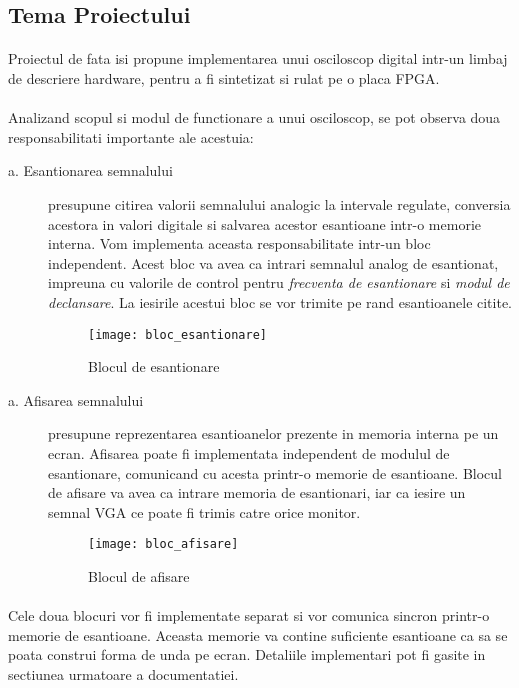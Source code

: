 \subsection{Tema Proiectului}
\paragraph{}
Proiectul de fata isi propune implementarea unui osciloscop digital intr-un limbaj de descriere hardware, pentru a fi sintetizat si rulat pe o placa FPGA.

\paragraph{}
Analizand scopul si modul de functionare a unui osciloscop, se pot observa doua responsabilitati importante ale acestuia:

\begin{description}
	\item[a. Esantionarea semnalului]
		presupune citirea valorii semnalului analogic la intervale regulate, conversia acestora in valori digitale si salvarea acestor esantioane intr-o memorie interna. Vom implementa aceasta responsabilitate intr-un bloc independent. Acest bloc va avea ca intrari semnalul analog de esantionat, impreuna cu valorile de control pentru \emph{frecventa de esantionare} si \emph{modul de declansare}. La iesirile acestui bloc se vor trimite pe rand esantioanele citite.
		
\begin{figure}[h]
	\centering
	\texttt{[image: bloc\_esantionare]}
	\caption{Blocul de esantionare}
	\label{fig:bloc_esantionare}
\end{figure}		
		
	\item[a. Afisarea semnalului]		
		presupune reprezentarea esantioanelor prezente in memoria interna pe un ecran. Afisarea poate fi implementata independent de modulul de esantionare, comunicand cu acesta printr-o memorie de esantioane. Blocul de afisare va avea ca intrare memoria de esantionari, iar ca iesire un semnal VGA ce poate fi trimis catre orice monitor.
		
\begin{figure}[h]
	\centering
	\texttt{[image: bloc\_afisare]}
	\caption{Blocul de afisare}
	\label{fig:bloc_afisare}
\end{figure}		
\end{description}

\paragraph{}
Cele doua blocuri vor fi implementate separat si vor comunica sincron printr-o memorie de esantioane. Aceasta memorie va contine suficiente esantioane ca sa se poata construi forma de unda pe ecran. Detaliile implementari pot fi gasite in sectiunea urmatoare a documentatiei.



